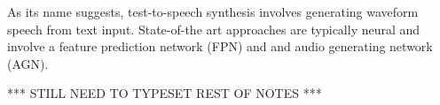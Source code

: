 As its name suggests, test-to-speech synthesis involves generating waveform speech from text input. 
State-of-the art approaches are typically neural and involve a feature prediction network (FPN) and 
and audio generating network (AGN).

*** STILL NEED TO TYPESET REST OF NOTES ***

\cite{ttsspontaneous}